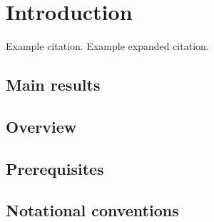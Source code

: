 \chapter{Introduction}

Example citation.\cite{einstein_rel} Example expanded citation.\parencite[Theorem 5.6]{lee_manifolds}

\section{Main results}

\section{Overview}

\section{Prerequisites}

\section{Notational conventions}